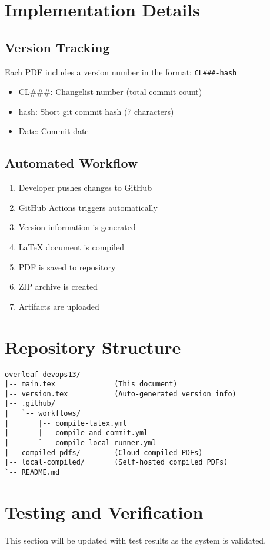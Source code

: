 \documentclass{article}
\begin{document}
\section{Implementation Details}

\subsection{Version Tracking}
Each PDF includes a version number in the format: \texttt{CL\#\#\#-hash}
\begin{itemize}
    \item CL\#\#\#: Changelist number (total commit count)
    \item hash: Short git commit hash (7 characters)
    \item Date: Commit date
\end{itemize}

\subsection{Automated Workflow}
\begin{enumerate}
    \item Developer pushes changes to GitHub
    \item GitHub Actions triggers automatically
    \item Version information is generated
    \item LaTeX document is compiled
    \item PDF is saved to repository
    \item ZIP archive is created
    \item Artifacts are uploaded
\end{enumerate}

\section{Repository Structure}
\begin{lstlisting}
overleaf-devops13/
|-- main.tex              (This document)
|-- version.tex           (Auto-generated version info)
|-- .github/
|   `-- workflows/
|       |-- compile-latex.yml
|       |-- compile-and-commit.yml
|       `-- compile-local-runner.yml
|-- compiled-pdfs/        (Cloud-compiled PDFs)
|-- local-compiled/       (Self-hosted compiled PDFs)
`-- README.md
\end{lstlisting}

\section{Testing and Verification}
This section will be updated with test results as the system is validated.
\end{document}
